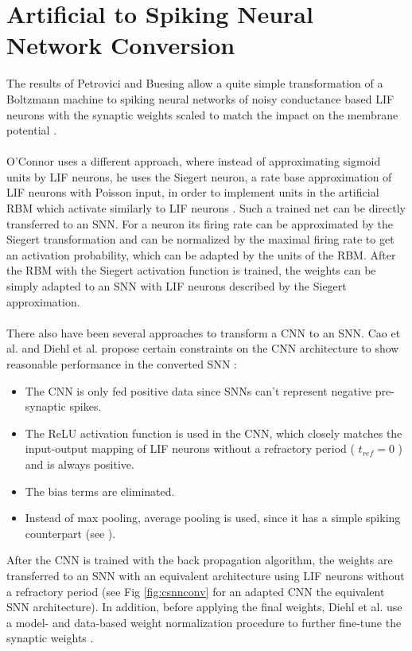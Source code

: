 \section{Artificial to Spiking Neural Network Conversion} \label{c:nnconversion}

The results of Petrovici and Buesing allow a quite simple transformation of a Boltzmann machine to spiking neural networks of noisy conductance based LIF neurons with the synaptic weights scaled to match the impact on the membrane potential \cite{Petrovici2016}.
\\
\\
O'Connor uses a different approach, where instead of approximating sigmoid units by LIF neurons, he uses the Siegert neuron, a rate base approximation of LIF neurons with Poisson input, in order to implement units in the artificial RBM which activate similarly to LIF neurons \cite{OConnor2013}. 
Such a trained net can be directly transferred to an SNN.
For a neuron its firing rate can be approximated by the Siegert transformation and can be normalized by the maximal firing rate to get an activation probability, which can be adapted by the units of the RBM. 
After the RBM with the Siegert activation function is trained, the weights can be simply adapted to an SNN with LIF neurons described by the Siegert approximation.
\\
\\
There also have been several approaches to transform a CNN to an SNN.  
Cao et al. and Diehl et al. propose certain constraints on the CNN architecture to show reasonable performance in the converted SNN \cite{Cao2014}\cite{Diehl2015}:
\begin{itemize}
\item The CNN is only fed positive data since SNNs can't represent negative pre-synaptic spikes. 
\item The ReLU activation function is used in the CNN, which closely matches the input-output mapping of LIF neurons without a refractory period ( $t_{ref}=0$ ) and is always positive.
\item The bias terms are eliminated.
\item Instead of max pooling, average pooling is used, since it has a simple spiking counterpart (see \cite{Cao2014}).
\end{itemize}
After the CNN is trained with the back propagation algorithm, the weights are transferred to an SNN with an equivalent architecture using LIF neurons without a refractory period (see Fig \ref{fig:csnnconv} for an adapted CNN the equivalent SNN architecture). 
In addition, before applying the final weights, Diehl et al. use a model- and data-based weight normalization procedure to further fine-tune the synaptic weights \cite{Diehl2015}. 

